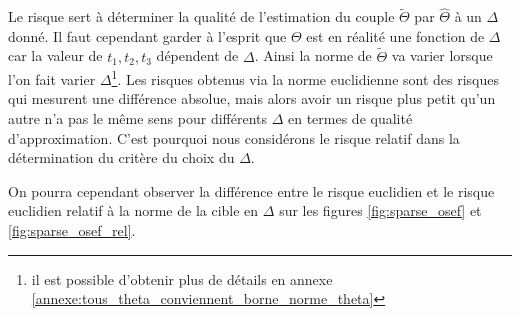 
Le risque sert à déterminer la qualité de l'estimation du couple $\widetilde \Theta$ par $\widehat \Theta$ à un $\Delta$ donné. Il faut cependant garder à l'esprit que $\Theta$ est en réalité une fonction de $\Delta$ car la valeur de $t_1, t_2, t_3$ dépendent de $\Delta$. Ainsi la norme de $\widetilde \Theta$ va varier lorsque l'on fait varier $\Delta$\footnote{il est possible d'obtenir plus de détails en annexe \ref{annexe:tous_theta_conviennent_borne_norme_theta}}. Les risques obtenus via la norme euclidienne sont des risques qui mesurent une différence absolue, mais alors avoir un risque plus petit qu'un autre n'a pas le même sens pour différents $\Delta$ en termes de qualité d'approximation. C'est pourquoi nous considérons le risque relatif dans la détermination du critère du choix du $\Delta$.

On pourra cependant observer la différence entre le risque euclidien et le risque euclidien relatif à la norme de la cible en $\Delta$ sur les figures \ref{fig:sparse_osef} et \ref{fig:sparse_osef_rel}.
